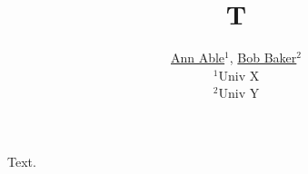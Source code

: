 \documentclass{article}
\begin{document}
\title{T}
\author{\href{https://orcid.org/0000-0001-0000-0001}{Ann Able}$^{1}$, \href{https://orcid.org/0000-0002-0000-0002}{Bob Baker}$^{2}$\\
$^{1}$Univ X\\ $^{2}$Univ Y}
\maketitle
Text.
\end{document}
